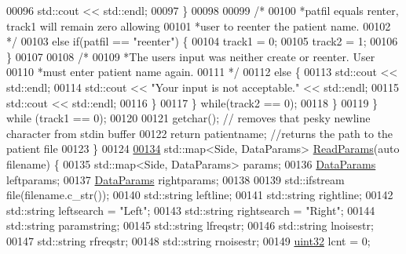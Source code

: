 \begin{DoxyCode}
00096                         std::cout << std::endl;
00097                     \}
00098 
00099                     \textcolor{comment}{/*}
00100 \textcolor{comment}{                     *patfil equals renter, track1 will remain zero allowing}
00101 \textcolor{comment}{                     *user to reenter the patient name.}
00102 \textcolor{comment}{                     */}
00103                     \textcolor{keywordflow}{else} \textcolor{keywordflow}{if}(patfil == \textcolor{stringliteral}{"reenter"}) \{
00104                         track1 = 0;
00105                         track2 = 1;
00106                     \}
00107 
00108                     \textcolor{comment}{/*}
00109 \textcolor{comment}{                     *The users input was neither create or reenter. User}
00110 \textcolor{comment}{                     *must enter patient name again.}
00111 \textcolor{comment}{                     */}
00112                     \textcolor{keywordflow}{else} \{
00113                         std::cout << std::endl;
00114                         std::cout << \textcolor{stringliteral}{"Your input is not acceptable."} << std::endl;
00115                         std::cout << std::endl;
00116                     \}
00117                 \} \textcolor{keywordflow}{while}(track2 == 0);
00118             \}
00119         \} \textcolor{keywordflow}{while} (track1 == 0);
00120 
00121         getchar();  \textcolor{comment}{// removes that pesky newline character from stdin buffer}
00122         \textcolor{keywordflow}{return} patientname; \textcolor{comment}{//returns the path to the patient file}
00123     \}
00124 
\hypertarget{fileio_8hpp_source_l00134}{}\hyperlink{namespaceavda_a46dc980b65ddfc24749ce25c1290e158}{00134}     std::map<Side, DataParams> \hyperlink{namespaceavda_a46dc980b65ddfc24749ce25c1290e158}{ReadParams}(\textcolor{keyword}{auto} filename) \{
00135         std::map<Side, DataParams> params;
00136         \hyperlink{structDataParams}{DataParams} leftparams;
00137         \hyperlink{structDataParams}{DataParams} rightparams;
00138 
00139         std::ifstream file(filename.c\_str());
00140         std::string leftline;
00141         std::string rightline;
00142         std::string leftsearch = \textcolor{stringliteral}{"Left"};
00143         std::string rightsearch = \textcolor{stringliteral}{"Right"};
00144         std::string paramstring;
00145         std::string lfreqstr;
00146         std::string lnoisestr;
00147         std::string rfreqstr;
00148         std::string rnoisestr;
00149         \hyperlink{definitions_8hpp_a1134b580f8da4de94ca6b1de4d37975e}{uint32} lcnt = 0;

\end{DoxyCode}
